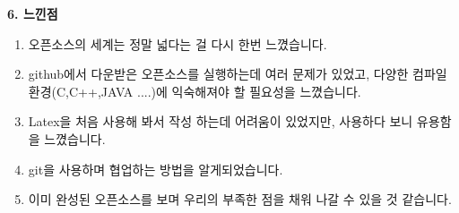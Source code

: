 \documentclass{article}
\begin{document}
\begin{large}\textbf{6. 느낀점}\end{large}
\begin{enumerate}
\item 오픈소스의 세계는 정말 넓다는 걸 다시 한번 느꼈습니다.
\item github에서 다운받은 오픈소스를 실행하는데 여러 문제가 있었고, 다양한 컴파일 환경(C,C++,JAVA ....)에 익숙해져야 할 필요성을 느꼈습니다. 
\item Latex을 처음 사용해 봐서 작성 하는데 어려움이 있었지만, 사용하다 보니 유용함을 느꼈습니다. 
\item git을 사용하며 협업하는 방법을 알게되었습니다.
\item 이미 완성된 오픈소스를 보며 우리의 부족한 점을 채워 나갈 수 있을 것 같습니다.

\end{enumerate}
\end{document}
